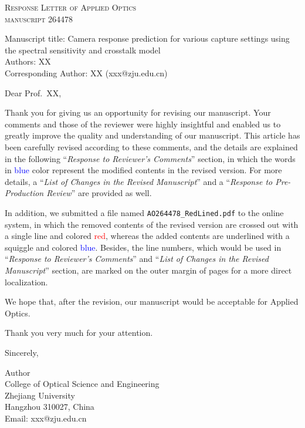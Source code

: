 \documentclass[12pt]{article}
\title{}
\author{}
\date{}
\newcounter{comment}
\newcommand{\add}[1]{\noindent\textcolor{blue}{#1}}
\begin{document}
	{\centering
	\textsc{{\LARGE Response Letter of Applied Optics\\ \medskip manuscript 264478}}\par}\vspace{2em}

	{\small \noindent
	{\selectfont Manuscript title}: Camera response prediction for various capture settings using the spectral sensitivity and crosstalk model\smallskip\\
	\noindent
	{\selectfont Authors}: XX\smallskip\\
	\noindent
	{\selectfont Corresponding Author}: XX (xxx@zju.edu.cn)
	\vspace{2em}
	
	\noindent
	Dear Prof.\ XX,\bigskip
	
	\noindent
	Thank you for giving us an opportunity for revising our manuscript. Your comments and those of the reviewer were highly insightful and enabled us to greatly improve the quality and understanding of our manuscript. This article has been carefully revised according to these comments, and the details are explained in the following ``\textit{Response to Reviewer's Comments}'' section, in which the words in \add{blue} color represent the modified contents in the revised version. For more details, a ``\textit{List of Changes in the Revised Manuscript}'' and a ``\textit{Response to Pre-Production Review}'' are provided as well.
	
	\noindent
	In addition, we submitted a file named \verb|AO264478_RedLined.pdf| to the online system, in which the removed contents of the revised version are crossed out with a single line and colored \textcolor{red}{red}, whereas the added contents are underlined with a squiggle and colored \textcolor{blue}{blue}. Besides, the line numbers, which would be used in ``\textit{Response to Reviewer's Comments}'' and ``\textit{List of Changes in the Revised Manuscript}'' section, are marked on the outer margin of pages for a more direct localization.
	
	\noindent
	We hope that, after the revision, our manuscript would be acceptable for Applied Optics.
	
	\noindent
	Thank you very much for your attention.\medskip
	
	\noindent
	Sincerely,\vfill
	
	\noindent
	Author\\[.1em]
	College of Optical Science and Engineering\\
	Zhejiang University\\
	Hangzhou 310027, China\\
	Email: xxx@zju.edu.cn}
		
\end{document}
